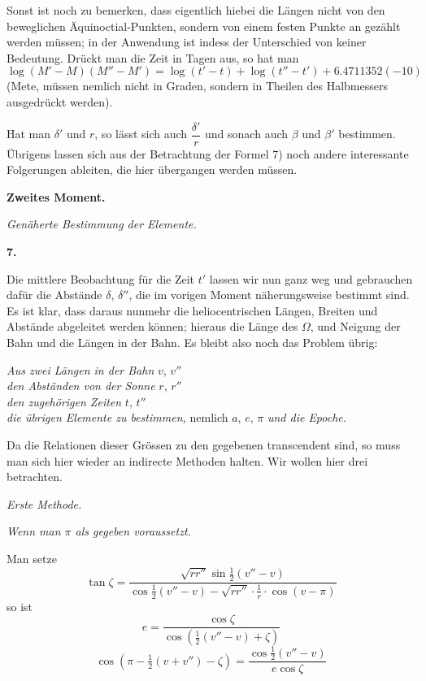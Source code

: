 \documentclass[10pt,a4paper]{article}
\begin{document}
Sonst ist noch zu bemerken, dass eigentlich hiebei die Längen nicht von den beweglichen Äquinoctial-Punkten, sondern von einem festen Punkte an gezählt werden müssen; in der Anwendung ist indess der Unterschied von keiner Bedeutung. Drückt man die Zeit in Tagen aus, so hat man
\[
\log(M' - M)(M'' - M') = \log(t' - t) + \log(t'' - t') + 6.4711352 (-10)
\]
(Mete, müssen nemlich nicht in Graden, sondern in Theilen des Halbmessers ausgedrückt werden).

Hat man $\delta'$ und $r$, so lässt sich auch $\dfrac{\delta'}{r}$ und sonach auch $\beta$ und $\beta'$ bestimmen. Übrigens lassen sich aus der Betrachtung der Formel 7) noch andere interessante Folgerungen ableiten, die hier übergangen werden müssen.

\medskip
\noindent
\textbf{Zweites Moment.}

\medskip
\noindent
\textit{Genäherte Bestimmung der Elemente.}

\medskip
\noindent
\textbf{7.}

\medskip
\noindent
Die mittlere Beobachtung für die Zeit $t'$ lassen wir nun ganz weg und gebrauchen dafür die Abstände $\delta$, $\delta''$, die im vorigen Moment näherungsweise bestimmt sind. Es ist klar, dass daraus nunmehr die heliocentrischen Längen, Breiten und Abstände abgeleitet werden können; hieraus die Länge des $\Omega$, und Neigung der Bahn und die Längen in der Bahn. Es bleibt also noch das Problem übrig:

\begin{center}
\textit{Aus zwei Längen in der Bahn} $v$, $v''$\\
\textit{den Abständen von der Sonne} $r$, $r''$\\
\textit{den zugehörigen Zeiten} $t$, $t''$\\
\textit{die übrigen Elemente zu bestimmen,} nemlich $a$, $e$, $\pi$ \textit{und die Epoche.}
\end{center}

Da die Relationen dieser Grössen zu den gegebenen transcendent sind, so muss man sich hier wieder an indirecte Methoden halten. Wir wollen hier drei betrachten.

\clearpage
\noindent
\textit{Erste Methode.}

\medskip
\noindent
\textit{Wenn man $\pi$ als gegeben voraussetzt.}

Man setze
\[
\tan\zeta = \frac{\sqrt{rr''}\sin\tfrac{1}{2}(v'' - v)}{\cos\tfrac{1}{2}(v'' - v) - \sqrt{rr''} \cdot \tfrac{1}{r} \cdot \cos(v - \pi)}
\]
so ist
\[
e = \frac{\cos\zeta}{\cos(\tfrac{1}{2}(v'' - v) + \zeta)}
\]
\[
\cos(\pi - \tfrac{1}{2}(v + v'') - \zeta) = \frac{\cos\tfrac{1}{2}(v'' - v)}{e\cos\zeta}
\]
\end{document}
